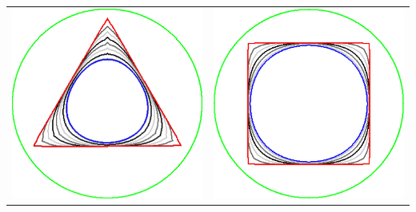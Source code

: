 \begin{frame}
{\begin{tabular}{cc}
\includegraphics[scale=0.12]{figures/graphcut/no-neighborhood-flow-always-improve/triangle.png}\hspace{3em} &
\includegraphics[scale=0.12]{figures/graphcut/no-neighborhood-flow-always-improve/square.png}\\[2em]

\end{tabular}}
\end{frame}
